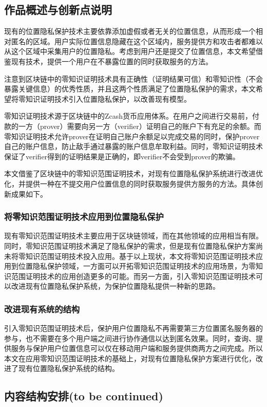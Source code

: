 \documentclass[zihao=-4]{ctexart}
\begin{document}
\subsection{作品概述与创新点说明}
现有的位置隐私保护技术主要依靠添加虚假或者无关的位置信息，从而形成一个相对匿名的区域。用户实际位置信息隐藏在这个区域内，服务提供方和攻击者都难以从这个区域中采集用户的位置隐私。考虑到用户还是提交了位置信息，本文希望借鉴现有技术，提供一个用户在不暴露位置的同时获取服务的方法。
\par 
注意到区块链中的零知识证明技术具有正确性（证明结果可信）和零知识性（不会暴露关键信息）的优秀性质，并且这两个性质满足了位置隐私保护的需求，本文希望将零知识证明技术引入位置隐私保护，以改善现有模型。
\par 
零知识证明技术源于区块链中的Zcash货币应用体系。在用户之间进行交易前，付款的一方（prover）需要向另一方（verifier）证明自己的账户下有充足的余额。而零知识证明技术允许prover在证明自己账户余额足以完成交易的同时，保护prover自己的账户信息，防止敌手通过暴露的账户信息牟取利益。同时，零知识证明技术保证了verifier得到的证明结果是正确的，即verifier不会受到prover的欺骗。
\par 
本文借鉴了区块链中的零知识范围证明技术，对现有位置隐私保护系统进行改进优化，并提供一种在不提交用户位置信息的同时获取服务提供方服务的方法。具体创新成果如下。

\subsubsection{将零知识范围证明技术应用到位置隐私保护}
现有零知识范围证明技术主要应用于区块链领域，而在其他领域的应用相当有限。同时，零知识范围证明技术满足了隐私保护的需求，但是现有位置隐私保护方案尚未将零知识范围证明技术投入应用。基于以上现状，本文将零知识范围证明技术应用到位置隐私保护领域，一方面可以开拓零知识范围证明技术的应用场景，为零知识范围证明技术的应用创造更多的可能。而另一方面，引入零知识范围证明技术可以改进现有位置隐私保护系统，为保护位置隐私提供一种新的思路。

\subsubsection{改进现有系统的结构}
引入零知识范围证明技术后，保护用户位置隐私不再需要第三方位置匿名服务器的参与，也不需要在多个用户端之间进行协作通信以达到匿名效果。同时，查询、提供服务与保护用户位置信息可以仅在移动用户端和服务提供商两方之间完成。所以本文在应用零知识范围证明技术的基础上，对现有位置隐私保护方案进行优化，改进了现有位置隐私保护系统的结构。


\subsection{内容结构安排(to be continued)}
\end{document}
